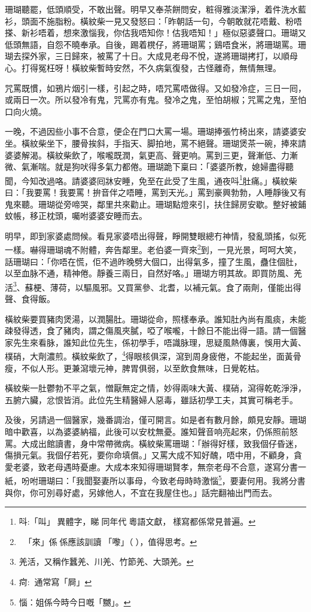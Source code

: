 \documentclass[a5paper, 12pt, openany]{book} %
\begin{document}
	珊瑚聽罷，低頭順受，不敢出聲。明早又奉茶餅問安，粧得雅淡潔淨，着件洗水藍衫，頭面不施脂粉。橫紋柴一見又發怒曰：「昨朝話一句，今朝敢就花唔戴、粉唔搽、新衫唔着，想來激惱我，你估我唔知你！估我唔知！」極似惡婆聲口。珊瑚又低頭無語，自怨不曉奉承。自後，踢着櫈仔，將珊瑚罵；鷄唔食米，將珊瑚罵。珊瑚去探外家，三日歸來，被罵了十日。大成見老母不悅，遂將珊瑚拷打，以順母心。打得冤枉呀！橫紋柴暫時安然，不久病氣復發，古怪離奇，無情無理。

	咒罵既慣，如鴉片烟引一樣，引起之時，唔咒罵唔做得。又如發冷症，三日一囘，或兩日一次。所以發冷有鬼，咒罵亦有鬼。發冷之鬼，至怕胡椒；咒罵之鬼，至怕口向火燒。

	一晚，不過因些小事不合意，便企在門口大罵一場。珊瑚捧張竹椅出來，請婆婆安坐。橫紋柴坐下，腰骨挨斜，手指天、脚拍地，罵不絕聲。珊瑚煲茶一碗，捧來請婆婆解渴。橫紋柴飲了，喉嚨既潤，氣更高、聲更响。罵到三更，聲漸低、力漸微、氣漸喘。就是狗吠得多氣力都倦。珊瑚跪下稟曰：「婆婆所教，媳婦盡得聽聞，今知改過咯。請婆婆囘牀安睡，免至在此受了生風，通夜呌\footnote{呌:「叫」󱝚異體字，睇同年代󱝚粵語文獻，󱜩樣寫都係常見普遍。}肚痛。」橫紋柴曰：「我要罵！我要罵！拚音伴之唔睡，罵到天光。」罵到豪興勃勃，人睡靜後又有鬼來聽。珊瑚從旁啼哭，鄰里共來勸止。珊瑚點燈來引，扶住歸房安歇。整好被鋪蚊帳，移正枕頭，囑咐婆婆安睡而去。

	明早，即到家婆處問候。看見家婆唔出得聲，睜開雙眼總冇神情，發亂頭搖，似死一樣。嚇得珊瑚魂不附體，奔告鄰里。老伯婆一齊來\footnote{「來」係𠄡係應該訓讀󱃲「嚟」（󰹚），值得思考。}到，一見光景，呵呵大笑，話珊瑚曰：「你唔在慌，佢不過昨晚劈大個口，出得氣多，撞了生風，蠱住個肚，以至血脉不通，精神倦。靜養三兩日，自然好咯。」珊瑚方明其故。即買防風、羌活\footnote{羌活，又稱作蠶羌、川羌、竹節羌、大頭羌。}、蘇梗、薄荷，以驅風邪。又買黨參、北耆，以補元氣。食了兩劑，僅能出得聲、食得飯。

	橫紋柴要買豬肉煲湯，以潤腸肚。珊瑚從命，照樣奉承。誰知肚內尚有風痰，未能疎發得透，食了豬肉，謂之傷風夾膩，啞了喉嚨，十餘日不能出得一語。請一個醫家先生來看脉，誰知此位先生，係初學手，唔識脉理，思疑風熱傳裏，悞用大黃、樸硝，大劑濃煎。橫紋柴飲了，\footnote{疴:通常寫「屙」}得眼核俱深，瀉到周身疲倦，不能起坐，面黃骨瘦，不似人形。更兼瀉壞元神，脾胃俱弱，以至飲食無味，日覺乾枯。

	橫紋柴一肚鬱勃不平之氣，憎厭無定之情，妙得兩味大黃、樸硝，瀉得乾乾淨淨，五腑六臟，忿恨皆消。此位先生精醫婦人惡毒，雖話初學工夫，其實可稱老手。

	及後，另請過一個醫家，幾番調治，僅可開言。如是者有數月餘，頗見安靜。珊瑚暗中歡喜，以為婆婆納福，此後可以安枕無憂。誰知聲音响亮起來，仍係照前怒罵。大成出館讀書，身中常帶微病。橫紋柴罵珊瑚：「辦得好樣，致我個仔昏迷，傷損元氣。我個仔若死，要你命填償。」又罵大成不知好醜，唔中用，不顧身，貪愛老婆，致老母遇時憂慮。大成本來知得珊瑚賢孝，無奈老母不合意，遂寫分書一紙，吩咐珊瑚曰：「我聞娶妻所以事母，今致老母時時激惱\footnote{惱：姐係今時今日嘅「嬲」。}，要妻何用。我將分書與你，你可別尋好處，另嫁他人，不宜在我屋住也。」話完翻袖出門而去。
\end{document}

